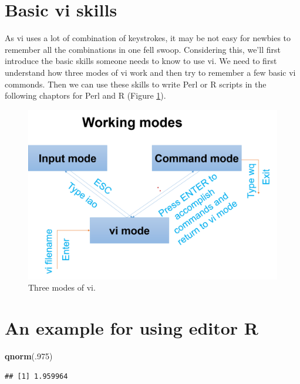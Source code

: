 \documentclass[]{book}
\makeatletter
\newenvironment{Shaded}{\begin{snugshade}}{\end{snugshade}}
\newcommand{\KeywordTok}[1]{\textcolor[rgb]{0.13,0.29,0.53}{\textbf{#1}}}
\newcommand{\DecValTok}[1]{\textcolor[rgb]{0.00,0.00,0.81}{#1}}
\newcommand{\NormalTok}[1]{#1}
\newenvironment{kframe}{%
\medskip{}
\setlength{\fboxsep}{.8em}
 \def\at@end@of@kframe{}%
 \ifinner\ifhmode%
  \def\at@end@of@kframe{\end{minipage}}%
  \begin{minipage}{\columnwidth}%
 \fi\fi%
 \def\FrameCommand##1{\hskip\@totalleftmargin \hskip-\fboxsep
 \colorbox{shadecolor}{##1}\hskip-\fboxsep
     \hskip-\linewidth \hskip-\@totalleftmargin \hskip\columnwidth}%
 \MakeFramed {\advance\hsize-\width
   \@totalleftmargin\z@ \linewidth\hsize
   \@setminipage}}%
 {\par\unskip\endMakeFramed%
 \at@end@of@kframe}
\renewenvironment{Shaded}{\begin{kframe}}{\end{kframe}}
\theoremstyle{definition}
\theoremstyle{definition}
\theoremstyle{definition}
\theoremstyle{remark}
\makeatother
\begin{document}
\section{Basic vi skills}\label{basic-vi-skills}

As vi uses a lot of combination of keystrokes, it may be not easy for
newbies to remember all the combinations in one fell swoop. Considering
this, we'll first introduce the basic skills someone needs to know to
use vi. We need to first understand how three modes of vi work and then
try to remember a few basic vi commonds. Then we can use these skills to
write Perl or R scripts in the following chaptors for Perl and R (Figure
\ref{fig:workingModeVi}).



\begin{figure}
\centering
\includegraphics{figures/workingModeVi.png}
\caption{\label{fig:workingModeVi}Three modes of vi.}
\end{figure}

\section{An example for using editor
R}\label{an-example-for-using-editor-r}

\begin{Shaded}
\begin{Highlighting}[]
\KeywordTok{qnorm}\NormalTok{(.}\DecValTok{975}\NormalTok{)}
\end{Highlighting}
\end{Shaded}

\begin{verbatim}
## [1] 1.959964
\end{verbatim}
\end{document}
